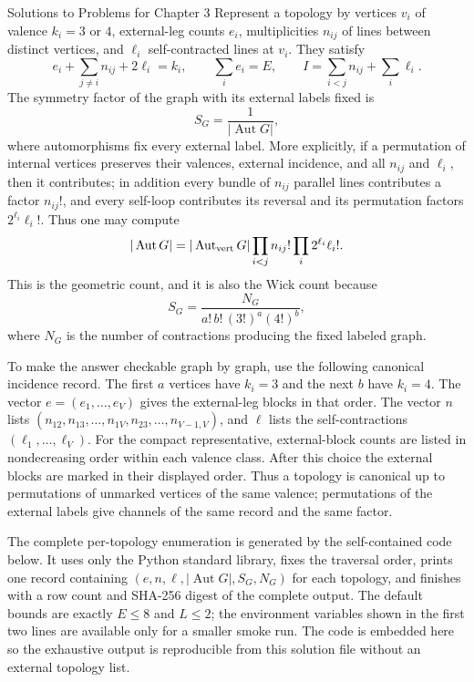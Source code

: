\begin{bankssolutions}{Solutions to Problems for Chapter 3}
Represent a topology by vertices $v_i$ of valence $k_i=3$ or $4$, external-leg
counts $e_i$, multiplicities $n_{ij}$ of lines between distinct vertices, and
$\ell_i$ self-contracted lines at $v_i$.  They satisfy
\begin{equation*}
 e_i+\sum_{j\ne i}n_{ij}+2\ell_i=k_i,
 \qquad \sum_i e_i=E,
 \qquad I=\sum_{i<j}n_{ij}+\sum_i\ell_i.
\end{equation*}
The symmetry factor of the graph with its external labels fixed is
\begin{equation*}
 S_G=\frac{1}{|\operatorname{Aut}G|},
\end{equation*}
where automorphisms fix every external label.  More explicitly, if a
permutation of internal vertices preserves their valences, external incidence,
and all $n_{ij}$ and $\ell_i$, then it contributes; in addition every bundle of
$n_{ij}$ parallel lines contributes a factor $n_{ij}!$, and every self-loop
contributes its reversal and its permutation factors $2^{\ell_i}\ell_i!$.
Thus one may compute
\begin{equation*}
 |\operatorname{Aut}G|
 =|\operatorname{Aut}_{\rm vert}G|
 \prod_{i<j}n_{ij}!\prod_i2^{\ell_i}\ell_i!.
\end{equation*}
This is the geometric count, and it is also the Wick count because
\begin{equation*}
 S_G=\frac{N_G}{a!\,b!\,(3!)^a(4!)^b},
\end{equation*}
where $N_G$ is the number of contractions producing the fixed labeled graph.

To make the answer checkable graph by graph, use the following canonical
incidence record.  The first $a$ vertices have $k_i=3$ and the next $b$ have
$k_i=4$.  The vector $e=(e_1,\ldots,e_V)$ gives the external-leg blocks in
that order.  The vector $n$ lists
$(n_{12},n_{13},\ldots,n_{1V},n_{23},\ldots,n_{V-1,V})$, and $\ell$ lists
the self-contractions $(\ell_1,\ldots,\ell_V)$.  For the compact
representative, external-block counts are listed in nondecreasing order within
each valence class.  After this choice the external blocks are marked in their
displayed order.  Thus a topology is canonical up to permutations of
unmarked vertices of the same valence; permutations of the external labels
give channels of the same record and the same factor.

The complete per-topology enumeration is generated by the self-contained code
below.  It uses only the Python standard library, fixes the traversal order,
prints one record containing $(e,n,\ell,|\operatorname{Aut}G|,S_G,N_G)$ for
each topology, and finishes with a row count and SHA-256 digest of the complete
output.  The default bounds are exactly $E\le8$ and $L\le2$; the environment
variables shown in the first two lines are available only for a smaller smoke
run.  The code is embedded here so the exhaustive output is reproducible from
this solution file without an external topology list.


\end{bankssolutions}
